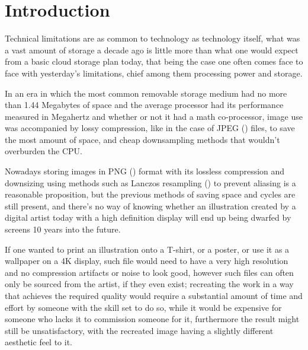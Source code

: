 
\chapter{Introduction} %

\label{Chapter1} %

Technical limitations are as common to technology as technology itself, what was a vast amount of storage a decade ago is little more than what one would expect from a basic cloud storage plan today, that being the case one often comes face to face with yesterday's limitations, chief among them processing power and storage.

\hfill

In an era in which the most common removable storage medium had no more than 1.44 Megabytes of space and the average processor had its performance measured in Megahertz and whether or not it had a math co-processor, image use was accompanied by lossy compression, like in the case of JPEG (\cite{JPEG}) files, to save the most amount of space, and cheap downsampling methods that wouldn't overburden the CPU.

\hfill

Nowadays storing images in PNG (\cite{PNG}) format with its lossless compression and downsizing using methods such as Lanczos resampling (\cite{wiki:Lanczos}) to prevent aliasing is a reasonable proposition, but the previous methods of saving space and cycles are still present, and there's no way of knowing whether an illustration created by a digital artist today with a high definition display will end up being dwarfed by screens 10 years into the future.

\hfill

If one wanted to print an illustration onto a T-shirt, or a poster, or use it as a wallpaper on a 4K display, such file would need to have a very high resolution and no compression artifacts or noise to look good, however such files can often only be sourced from the artist, if they even exist; recreating the work in a way that achieves the required quality would require a substantial amount of time and effort by someone with the skill set to do so, while it would be expensive for someone who lacks it to commission someone for it, furthermore the result might still be unsatisfactory, with the recreated image having a slightly different aesthetic feel to it.


